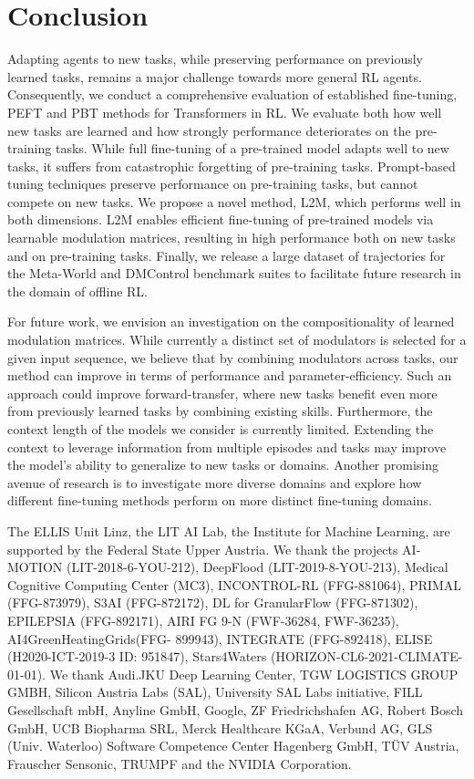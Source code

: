 \documentclass{article}
\begin{document}
\section{Conclusion}\label{sec:conclusion}
Adapting agents to new tasks, while preserving performance on previously learned tasks, remains a major challenge towards more general RL agents.
Consequently, we conduct a comprehensive evaluation of established fine-tuning, PEFT and PBT methods for Transformers in RL. 
We evaluate both how well new tasks are learned and how strongly performance deteriorates on the pre-training tasks.
While full fine-tuning of a pre-trained model adapts well to new tasks, it suffers from catastrophic forgetting of pre-training tasks. 
Prompt-based tuning techniques preserve performance on pre-training tasks, but cannot compete on new tasks.
We propose a novel method, L2M, which performs well in both dimensions. 
L2M enables efficient fine-tuning of pre-trained models via learnable modulation matrices, resulting in high performance both on new tasks and on pre-training tasks.
Finally, we release a large dataset of trajectories for the Meta-World and DMControl benchmark suites to facilitate future research in the domain of offline RL.

For future work, we envision an investigation on the compositionality of learned modulation matrices.
While currently a distinct set of modulators is selected for a given input sequence, we believe that by combining modulators across tasks, our method can improve in terms of performance and parameter-efficiency. 
Such an approach could improve forward-transfer, where new tasks benefit even more from previously learned tasks by combining existing skills. 
Furthermore, the context length of the models we consider is currently limited. Extending the context to leverage information from multiple episodes and tasks may improve the model's ability to generalize to new tasks or domains. 
Another promising avenue of research is to investigate more diverse domains and explore how different fine-tuning methods perform on more distinct fine-tuning domains.


\begin{ack}
The ELLIS Unit Linz, the LIT AI Lab, the Institute for Machine Learning, are supported by the Federal State Upper Austria. We thank the projects AI-MOTION (LIT-2018-6-YOU-212), DeepFlood (LIT-2019-8-YOU-213), Medical Cognitive Computing Center (MC3), INCONTROL-RL (FFG-881064), PRIMAL (FFG-873979), S3AI (FFG-872172), DL for GranularFlow (FFG-871302), EPILEPSIA (FFG-892171), AIRI FG 9-N (FWF-36284, FWF-36235), AI4GreenHeatingGrids(FFG- 899943), INTEGRATE (FFG-892418), ELISE (H2020-ICT-2019-3 ID: 951847), Stars4Waters (HORIZON-CL6-2021-CLIMATE-01-01). We thank Audi.JKU Deep Learning Center, TGW LOGISTICS GROUP GMBH, Silicon Austria Labs (SAL), University SAL Labs initiative, FILL Gesellschaft mbH, Anyline GmbH, Google, ZF Friedrichshafen AG, Robert Bosch GmbH, UCB Biopharma SRL, Merck Healthcare KGaA, Verbund AG, GLS (Univ. Waterloo) Software Competence Center Hagenberg GmbH, T\"{U}V Austria, Frauscher Sensonic, TRUMPF and the NVIDIA Corporation.
\end{ack}





\end{document}
